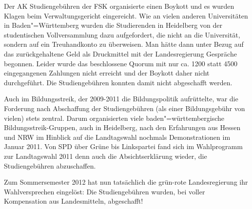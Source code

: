Der AK Studiengebühren der \gls{FSK} organisierte einen Boykott und es wurden Klagen beim Verwaltungsgericht eingereicht. Wie an vielen anderen Universitäten in Baden"=Württemberg wurden die Studierenden in Heidelberg von der studentischen Vollversammlung dazu aufgefordert, die  nicht an die Universität, sondern auf ein Treuhandkonto zu überweisen. Man hätte dann unter Bezug auf das zurückgehaltene Geld als Druckmittel mit der Landesregierung Gespräche begonnen. Leider wurde das beschlossene Quorum mit nur ca. 1200 statt 4500 eingegangenen Zahlungen nicht erreicht und der Boykott daher nicht durchgeführt. Die Studiengebühren konnten damit nicht abgeschafft werden.

Auch im Bildungsstreik, der 2009-2011 die Bildungspolitik aufrüttelte, war die Forderung nach Abschaffung der Studiengebühren (als einer Bildungsgebühr von vielen) stets zentral. Darum organisierten viele baden"=württembergische Bildungsstreik-Gruppen, auch in Heidelberg, nach den Erfahrungen aus Hessen und NRW im Hinblick auf die Landtagswahl nochmals Demonstrationen im Januar 2011. Von SPD über Grüne bis Linkspartei fand sich im Wahlprogramm zur Landtagswahl 2011 denn auch die Absichtserklärung wieder, die Studiengebühren abzuschaffen.

Zum Sommersemester 2012 hat nun tatsächlich die grün-rote Landesregierung ihr Wahlversprechen eingelöst: Die Studiengebühren wurden, bei voller Kompensation aus Landesmitteln, abgeschafft!

\fi

